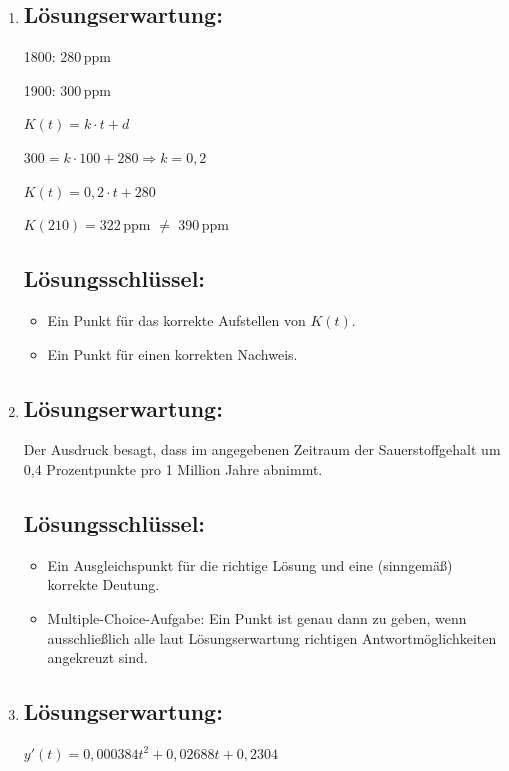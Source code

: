 \begin{langesbeispiel}
{\begin{enumerate}
\begin{itemize}
	\end{itemize}
	
	\item \subsection{Lösungserwartung:}
			
		1800: 280\,ppm
		
		1900: 300\,ppm\leer
		
		$K(t)=k\cdot t+d$
		
		$300=k\cdot 100+280 \Rightarrow k=0,2$\leer
		
		$K(t)=0,2\cdot t+280$\leer
		
		$K(210)=322$\,ppm $\neq$ 390\,ppm
		
	\subsection{Lösungsschlüssel:}
	
\begin{itemize}
	\item  Ein Punkt für das korrekte Aufstellen von $K(t)$.
	\item  Ein Punkt für einen korrekten Nachweis. 
\end{itemize}

\item \subsection{Lösungserwartung:}
			Der Ausdruck besagt, dass im angegebenen Zeitraum der Sauerstoffgehalt um 0,4 Prozentpunkte pro 1 Million Jahre abnimmt.
		
	\subsection{Lösungsschlüssel:}
	
\begin{itemize}
	\item  Ein Ausgleichspunkt für die richtige Lösung und eine (sinngemäß) korrekte Deutung.
	\item  Multiple-Choice-Aufgabe: Ein Punkt ist genau dann zu geben, wenn ausschließlich alle laut Lösungserwartung richtigen Antwortmöglichkeiten angekreuzt sind. 
\end{itemize}

\item \subsection{Lösungserwartung:}
			$y'(t)=0,000384t^2+0,02688t+0,2304$
			

\end{enumerate}}
\end{langesbeispiel}
